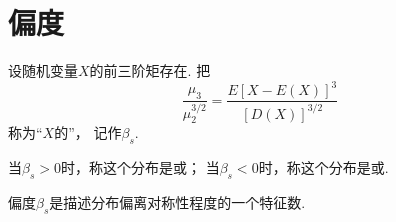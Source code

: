 \section{偏度}
\begin{definition}
设随机变量\(X\)的前三阶矩存在.
把\[
	\frac{\mu_3}{\mu_2^{3/2}}
	=\frac{E[X-E(X)]^3}{[D(X)]^{3/2}}
\]称为“\(X\)的”，
记作\(\beta_s\).

当\(\beta_s>0\)时，称这个分布是或；
当\(\beta_s<0\)时，称这个分布是或.
\end{definition}

偏度\(\beta_s\)是描述分布偏离对称性程度的一个特征数.
